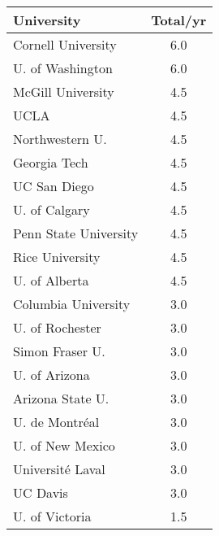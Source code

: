 \documentclass[aspectratio=169]{beamer}
\begin{document}
\begin{frame}[fragile]
\begin{columns}[T]
\begin{column}{0.5\textwidth}
\begin{tabularx}{\linewidth}{lS[table-format=1.1]}
                \toprule
                \textbf{University} & {\textbf{Total/yr}} \\
                \midrule
                Cornell University & 6.0 \\
                U. of Washington & 6.0 \\
                McGill University & 4.5 \\
                UCLA & 4.5 \\
                Northwestern U. & 4.5 \\
                Georgia Tech & 4.5 \\
                UC San Diego & 4.5 \\
                U. of Calgary & 4.5 \\
                Penn State University & 4.5 \\
                Rice University & 4.5 \\
                U. of Alberta & 4.5 \\
                Columbia University & 3.0 \\
                U. of Rochester & 3.0 \\
                Simon Fraser U. & 3.0 \\
                U. of Arizona & 3.0 \\
                Arizona State U. & 3.0 \\ 
                U. de Montréal & 3.0 \\
                U. of New Mexico & 3.0 \\
                Université Laval & 3.0 \\
                UC Davis & 3.0 \\
                U. of Victoria & 1.5 \\
                \bottomrule
            \end{tabularx}
        \end{column}
    \end{columns}
\end{frame}
\end{document}

